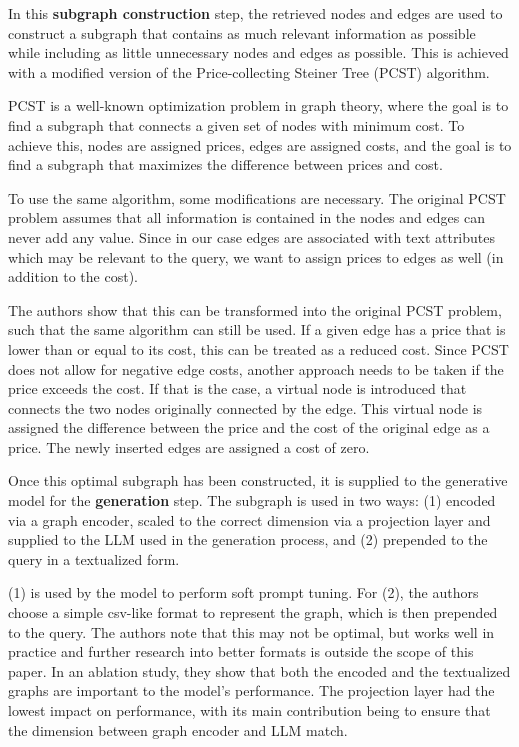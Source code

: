 In this \textbf{subgraph construction} step, the retrieved nodes and edges are used to construct a subgraph that contains as much relevant information as possible while including as little unnecessary nodes and edges as possible.
This is achieved with a modified version of the Price-collecting Steiner Tree (PCST) algorithm.

PCST is a well-known optimization problem in graph theory, where the goal is to find a subgraph that connects a given set of nodes with minimum cost.
To achieve this, nodes are assigned prices, edges are assigned costs, and the goal is to find a subgraph that maximizes the difference between prices and cost.

To use the same algorithm, some modifications are necessary.
The original PCST problem assumes that all information is contained in the nodes and edges can never add any value.
Since in our case edges are associated with text attributes which may be relevant to the query, we want to assign prices to edges as well (in addition to the cost).

The authors show that this can be transformed into the original PCST problem, such that the same algorithm can still be used.
If a given edge has a price that is lower than or equal to its cost, this can be treated as a reduced cost.
Since PCST does not allow for negative edge costs, another approach needs to be taken if the price exceeds the cost.
If that is the case, a virtual node is introduced that connects the two nodes originally connected by the edge.
This virtual node is assigned the difference between the price and the cost of the  original edge as a price.
The newly inserted edges are assigned a cost of zero.

Once this optimal subgraph has been constructed, it is supplied to the generative model for the \textbf{generation} step.
The subgraph is used in two ways: (1) encoded via a graph encoder, scaled to the correct dimension via a projection layer and supplied to the LLM used in the generation process, and (2) prepended to the query in a textualized form.

(1) is used by the model to perform soft prompt tuning. For (2), the authors choose a simple csv-like format to represent the graph, which is then prepended to the query.
The authors note that this may not be optimal, but works well in practice and further research into better formats is outside the scope of this paper.
In an ablation study, they show that both the encoded and the textualized graphs are important to the model's performance.
The projection layer had the lowest impact on performance, with its main contribution being to ensure that the dimension between graph encoder and LLM match.


